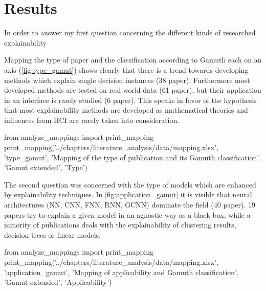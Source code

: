 \section{Results}

In order to answer my first question concerning the different kinds of researched explainability 

Mapping the type of paper and the classification according to Gamuth each on an axis (\autoref{fig:type_gamut}) shows clearly that there is a trend towards developing methods which explain single decision instances (38 paper). Furthermore most developed methods are tested on real world data (61 paper), but their application in an interface is rarely studied (6 paper). This speaks in favor of the hypothesis that most explainability methods are developed as mathematical theories and influences from HCI are rarely taken into consideration.

\begin{pycode}
from analyze_mappings import print_mapping
print_mapping('../chapters/literature_analysis/data/mapping.xlsx', 'type_gamut', 'Mapping of the type of publication and its Gamuth classification', 'Gamut extended', 'Type')
\end{pycode}

The second question was concerned with the type of models which are enhanced by explainability techniques. In \autoref{fig:application_gamut} it is visible that neural architectures (NN, CNN, FNN, RNN, GCNN) dominate the field (40 paper). 19 papers try to explain a given model in an agnostic way as a black box, while a minority of publications deals with the explainability of clustering results, decision trees or linear models.

\begin{pycode}
from analyze_mappings import print_mapping
print_mapping('../chapters/literature_analysis/data/mapping.xlsx', 'application_gamut', 'Mapping of applicability and Gamuth classification', 'Gamut extended', 'Applicability')
\end{pycode}

